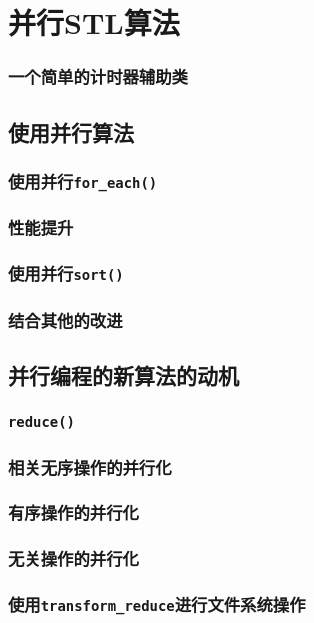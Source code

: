 \section{并行STL算法}\label{ch22}

\subsubsection*{一个简单的计时器辅助类}

\subsection{使用并行算法}

\subsubsection{使用并行\texttt{for\_each()}}

\subsubsection*{性能提升}

\subsubsection{使用并行\texttt{sort()}}

\subsubsection*{结合其他的改进}\label{ch22.1.2.1}

\subsection{并行编程的新算法的动机}

\subsubsection{\texttt{reduce()}}
\subsubsection*{相关无序操作的并行化}
\subsubsection*{有序操作的并行化}
\subsubsection*{无关操作的并行化}
\subsubsection*{使用\texttt{transform\_reduce}进行文件系统操作}\label{ch22.6.1.4}
